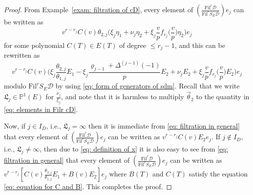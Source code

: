 \documentclass[11pt]{amsart}
\theoremstyle{definition}
\numberwithin{equation}{subsection}
\theoremstyle{plain}
\theoremstyle{plain}
\theoremstyle{plain}
\theoremstyle{plain}
\theoremstyle{plain}
\theoremstyle{plain}
\theoremstyle{plain}
\theoremstyle{plain}
\theoremstyle{plain}
\theoremstyle{plain}
\theoremstyle{plain}
\theoremstyle{plain}
\theoremstyle{definition}
\theoremstyle{definition}
\theoremstyle{definition}
\theoremstyle{remark}
\renewcommand{\(}{\textup{(}}
\renewcommand{\)}{\textup{)}}
\newcommand{\fL}{\mathfrak{L}}
\newcommand{\Fil}{\mathrm{Fil}}
\newcommand{\cD}{\mathcal{D}}
\newcommand{\vth}{\vec{\theta}}
\begin{document}
\begin{proof}
From Example~\ref{exam: filtration of cD}, every element of $\left(\frac{\Fil^r\cD}{\Fil^rS_E\cD}\right)e_j$ can be written as
\begin{equation}\label{eq: elements in Filr cD}
v^{r-r_j}C(v)\theta_{2,j}\Big(
    \xi_j\eta_1+\nu_j\eta_2+\xi_j\frac{v}{p}f_{r_j}\Big(\frac{v}{p}\Big)\eta_2
    \Big)e_j
\end{equation}
for some polynomial $C(T)\in E(T)$ of degree $\leq r_j-1$, and this can be rewritten as
\begin{equation}\label{eq: filtration in general}
v^{r-r_j}C(v)\bigg(
    \xi_j\frac{\theta_{2,j}}{\theta_{1,j}}E_1-\xi_j\frac{\varrho_{j-1}+\Delta^{(j-1)}(-1)}{p}E_2+\nu_jE_2
    +\xi_j\frac{v}{p}f_{r_j}\Big(\frac{v}{p}\Big)E_2
    \bigg)e_j
\end{equation}
modulo $\Fil^rS_E\cD$ by using \eqref{eq: form of generators of sdm}. Recall that we write $\fL_j\in\mathbb{P}^1(E)$ for $\frac{\nu_j}{\xi_j}$, and note that it is harmless to multiply $\vth_2$ to the quantity in \eqref{eq: elements in Filr cD}. 

Now, if $j\in I_D$, i.e., $\fL_j=\infty$ then it is immediate from \eqref{eq: filtration in general} that every element of $\left(\frac{\Fil^r\cD}{\Fil^rS_E\cD}\right)e_j$ can be written as $v^{r-r_j}C(v)E_2e_j$. If $j\not\in I_D$, i.e., $\fL_j\neq\infty$, then due to \eqref{eq: definition of x} it is also easy to see from \eqref{eq: filtration in general} that every element of $\left(\frac{\Fil^r\cD}{\Fil^rS_E\cD}\right)e_j$ can be written as $v^{r-r_j}\left[C(v)\frac{\theta_{2,j}}{\theta_{1,j}} E_1+B(v)E_2\right]e_j$ where
$B(T)$ and $C(T)$ satisfy the equation \eqref{eq: equation for C and B}. This completes the proof.
\end{proof}
\end{document}

